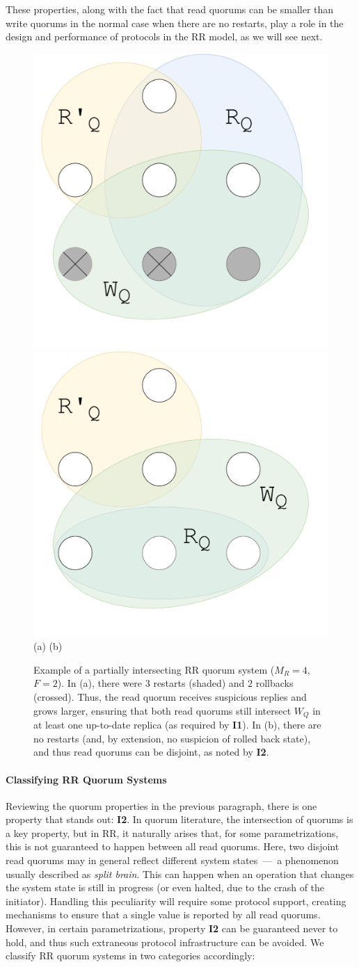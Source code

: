 These properties, along with the fact that read quorums can be
smaller than write quorums in the normal case when there
are no restarts, play a role in the design and performance of
protocols in the \ac{RR} model, as we will see next.

\begin{figure}[t]
    \centering
        \includegraphics[width=.32\linewidth]{img/RR_quorums_I1}
        \includegraphics[width=.32\linewidth]{img/RR_quorums_I2}\\
        (a) \hspace{2.3cm} (b) \hspace{.2cm}
    \caption{Example of a partially intersecting \ac{RR} quorum system ($M_R=4$,
    $F=2$). In (a), there were $3$ restarts (shaded) and $2$ rollbacks
    (crossed). Thus, the read quorum receives suspicious replies and
    grows larger, ensuring that both read quorums still intersect $W_Q$ in
    at least one up-to-date replica (as required by \textbf{I1}).
    In (b), there are no restarts (and, by extension, no
    suspicion of rolled back state), and thus read quorums can be
    disjoint, as noted by \textbf{I2}.}\label{fig:quorums}
\end{figure}

\paragraph{Classifying \ac{RR} Quorum Systems}
Reviewing the quorum properties in the previous paragraph,
there is one property that stands out: \textbf{I2}. In quorum
literature, the intersection of quorums is a key property, but
in \ac{RR}, it naturally arises that, for some
parametrizations, this is not guaranteed to happen between all
read quorums. Here, two disjoint read quorums may in general
reflect different system states~---~a phenomenon usually
described as {\em split brain}.  This can happen when an
operation that changes the system state is still in progress (or
even halted, due to the crash of the initiator). Handling this
peculiarity will require some protocol support, creating
mechanisms to ensure that a single value is reported by all read
quorums. However, in certain parametrizations, property
\textbf{I2} can be guaranteed never to hold, and thus such
extraneous protocol infrastructure can be avoided. We classify
\ac{RR} quorum systems in two categories accordingly:

